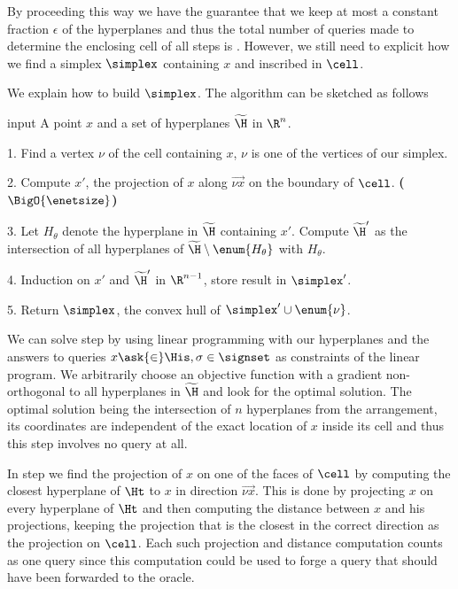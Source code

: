 By proceeding this way we have the guarantee that we keep at most a
constant fraction \(\epsilon\) of the hyperplanes and thus the total number of
queries made to determine the enclosing cell of
all steps is . However, we
still need to explicit how we find a simplex $\simplex$ containing $x$ and
inscribed in $\cell$.

We explain how to build $\simplex$. The algorithm can be sketched as
follows
\begin{algorithm}
\item[input] A point \(x\) and a set of hyperplanes \(\widetilde{\H}\) in
\(\R^n\).
\item[1.] Find a vertex $\nu$ of the cell containing $x$, $\nu$ is one of
the vertices of our simplex.
\item[2.] Compute $x'$, the projection of $x$ along $\vec{\nu x}$ on the
boundary of \(\cell\). \textbf{($\BigO{\enetsize}$)}
\item[3.] Let \(H_{\theta}\) denote the hyperplane in \(\widetilde{\H}\)
containing \(x'\). Compute \(\widetilde{\H}'\) as the intersection of all
hyperplanes of \(\widetilde{\H} \setminus \enum{H_{\theta}}\) with
\(H_{\theta}\).
\item[4.] Induction on \(x'\) and \(\widetilde{\H}'\) in $\R^{n-1}$, store result in \(\simplex'\).
\item[5.] Return \(\simplex\), the convex hull of \(\simplex' \cup \enum{\nu}\).
\end{algorithm}

We can solve step  by using linear programming with our  hyperplanes and the answers to queries $x \ask{\in} \His, \sigma \in
\signset$ as constraints of the linear program. We arbitrarily choose an
objective function with a gradient non-orthogonal to all hyperplanes in
\(\widetilde{\H}\) and look for
the optimal solution. The optimal solution being the intersection of \(n\)
hyperplanes from the arrangement, its coordinates are independent of the exact
location of \(x\) inside its cell and thus this step involves no query at all.

In step  we find the projection of $x$ on one of the faces of
$\cell$ by computing the closest hyperplane of $\Ht$ to $x$ in direction
$\vec{\nu x}$. This is done by projecting $x$ on every hyperplane of $\Ht$ and
then computing the distance between $x$ and his projections, keeping the
projection that is the closest in the correct direction as the projection
on $\cell$. Each such projection and distance computation counts as one query
since this computation could be used to forge a query that should have been
forwarded to the oracle.

